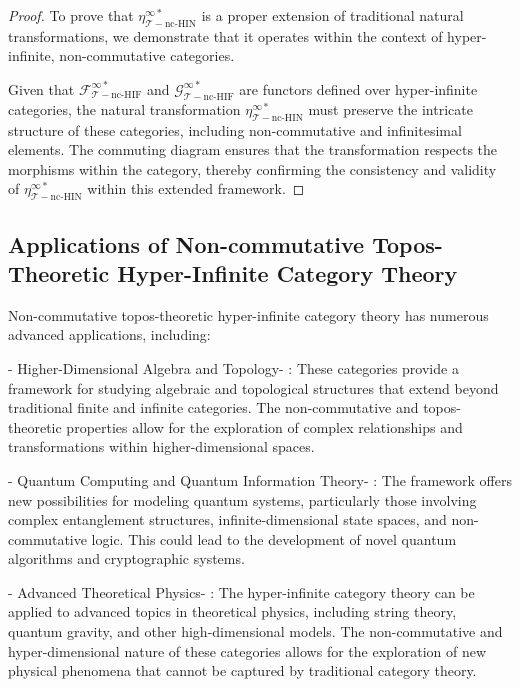 \documentclass{article}
\begin{document}
\begin{proof}
To prove that \(\eta_{\mathcal{T}-\text{nc-HIN}}^{\infty *}\) is a proper extension of traditional natural transformations, we demonstrate that it operates within the context of hyper-infinite, non-commutative categories.

Given that \(\mathcal{F}_{\mathcal{T}-\text{nc-HIF}}^{\infty *}\) and \(\mathcal{G}_{\mathcal{T}-\text{nc-HIF}}^{\infty *}\) are functors defined over hyper-infinite categories, the natural transformation \(\eta_{\mathcal{T}-\text{nc-HIN}}^{\infty *}\) must preserve the intricate structure of these categories, including non-commutative and infinitesimal elements. The commuting diagram ensures that the transformation respects the morphisms within the category, thereby confirming the consistency and validity of \(\eta_{\mathcal{T}-\text{nc-HIN}}^{\infty *}\) within this extended framework.
\end{proof}

\subsection{Applications of Non-commutative Topos-Theoretic Hyper-Infinite Category Theory}
Non-commutative topos-theoretic hyper-infinite category theory has numerous advanced applications, including:

-  Higher-Dimensional Algebra and Topology- : These categories provide a framework for studying algebraic and topological structures that extend beyond traditional finite and infinite categories. The non-commutative and topos-theoretic properties allow for the exploration of complex relationships and transformations within higher-dimensional spaces.

-  Quantum Computing and Quantum Information Theory- : The framework offers new possibilities for modeling quantum systems, particularly those involving complex entanglement structures, infinite-dimensional state spaces, and non-commutative logic. This could lead to the development of novel quantum algorithms and cryptographic systems.

-  Advanced Theoretical Physics- : The hyper-infinite category theory can be applied to advanced topics in theoretical physics, including string theory, quantum gravity, and other high-dimensional models. The non-commutative and hyper-dimensional nature of these categories allows for the exploration of new physical phenomena that cannot be captured by traditional category theory.
\end{document}
